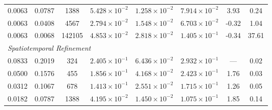 \documentclass[10pt,a4paper]{article}
\begin{document}
\begin{table}[htbp]
\begin{tabular}{cccccccc}
0.0063 & 0.0787 & 1388           & $5.428 \times 10^{-2}$ & $1.258 \times 10^{-2}$ & $7.914 \times 10^{-2}$ & 3.93 & 0.24 \\
0.0063 & 0.0408 & 4567           & $2.794 \times 10^{-2}$ & $1.548 \times 10^{-2}$ & $6.703 \times 10^{-2}$ & -0.32 & 1.04 \\
0.0063 & 0.0068 & 142105         & $4.853 \times 10^{-2}$ & $2.818 \times 10^{-2}$ & $1.405 \times 10^{-1}$ & -0.34 & 37.61 \\
\midrule
\multicolumn{8}{l}{\textit{Spatiotemporal Refinement}} \\
0.0833 & 0.2019 & \phantom{0}324 & $2.405 \times 10^{-1}$ & $6.436 \times 10^{-2}$ & $2.932 \times 10^{-1}$ & ---  & 0.02 \\
0.0500 & 0.1576 & \phantom{0}455 & $1.856 \times 10^{-1}$ & $4.168 \times 10^{-2}$ & $2.423 \times 10^{-1}$ & 1.76 & 0.03 \\
0.0312 & 0.1067 & \phantom{0}678 & $1.413 \times 10^{-1}$ & $2.551 \times 10^{-2}$ & $1.715 \times 10^{-1}$ & 1.26 & 0.05 \\
0.0182 & 0.0787 & 1388           & $4.195 \times 10^{-2}$ & $1.450 \times 10^{-2}$ & $1.075 \times 10^{-1}$ & 1.85 & 0.14 \\
\bottomrule
\end{tabular}
\end{table}


\vspace{0.3cm}
\end{document}
